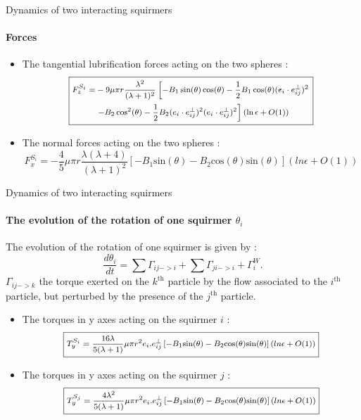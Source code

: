 \documentclass{beamer}
\begin{document}
\begin{frame}{Dynamics of two interacting squirmers}
        \framesubtitle{Forces}
        \begin{itemize}
            \item The tangential lubrification forces acting on the two spheres : \begin{equation*}
    \footnotesize
    \boxed{
        \begin{aligned}
        F_z^{S_i} = & -9 \mu \pi r \frac{\lambda ^2}{(\lambda +1)^2} \left[ -B_1 \sin(\theta)\cos(\theta) - \frac{1}{2} B_1  \cos(\theta) (e_i \cdot e^{\perp}_{ij})^2 \right. \\
        & \left. -B_2 \cos^2(\theta) - \frac{1}{2} B_2 (e_i \cdot e^{\perp}_{ij})^2 (e_i \cdot e^{\perp}_{ij})^2 \right] (\ln \epsilon + O(1))
        \end{aligned}
    }
    \end{equation*}
        \item The normal forces acting on the two spheres :
        \begin{equation*}
        \boxed{F_x^{S_i} = -\frac{4}{5} \mu \pi r \frac{\lambda(\lambda +4)}{(\lambda +1)^2} \left[ -B_1\mathrm{sin}(\theta) -B_2\mathrm{cos}(\theta)\mathrm{sin}(\theta)\right] (ln \epsilon + O(1))}
    \end{equation*}
        \end{itemize}
    
\end{frame}
    
\begin{frame}{Dynamics of two interacting squirmers}
        \framesubtitle{The evolution of the rotation of one squirmer $\theta _i$}
    The evolution of the rotation of one squirmer is given by : 
    $$
    \frac{d \theta_i}{dt} = \sum \Gamma_{ij->i} + \sum \Gamma_{ji->i} +  \Gamma_{i}^W.
    $$ 
    $\Gamma_{ij->k}$ the torque exerted on the $k^\mathrm{th}$ particle by the flow associated to the $i^\mathrm{th}$ particle, but perturbed by the presence of the $j^\mathrm{th}$ particle.
    
    \begin{itemize}
        \item The torques in y axes acting on the squirmer $i$ :
        \begin{equation*}
        \footnotesize
        \boxed{T_y^{S_i} = \frac{16 \lambda}{5(\lambda +1)} \mu \pi r^2 e_i.e^{\perp}_{ij}\left[-B_1\mathrm{sin}(\theta) -B_2\mathrm{cos}(\theta)\mathrm{sin}(\theta) \right] (ln \epsilon + O(1))}
    \end{equation*}
        \item The torques in y axes acting on the squirmer $j$ :
        \begin{equation*}
        \footnotesize
        \boxed{T_y^{S_j} = \frac{4 \lambda^2}{5(\lambda +1)} \mu \pi r^2 e_i.e^{\perp}_{ij}\left[-B_1\mathrm{sin}(\theta) -B_2\mathrm{cos}(\theta)\mathrm{sin}(\theta) \right] (ln \epsilon + O(1))}
    \end{equation*}
    \end{itemize}
        
\end{frame}
\end{document}
